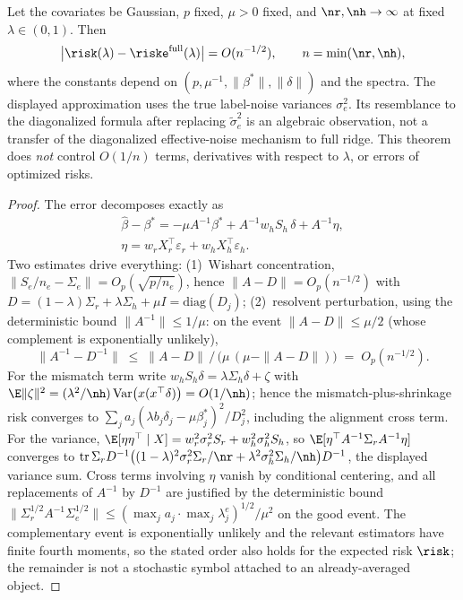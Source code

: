 \begin{theorem}\label{supp:thm:t1b}
Let the covariates be Gaussian, $p$ fixed, $\mu > 0$ fixed, and $\nr, \nh \to \infty$ at fixed $\lambda \in (0,1)$.
Then
\begin{equation}
  \big|\risk(\lambda)-\riske^{\mathrm{full}}(\lambda)\big| = O(n^{-1/2}),
  \qquad n=\min(\nr,\nh),
  \label{supp:eq:t1b}
\end{equation}
where the constants depend on $(p,\mu^{-1},\|\beta^*\|,\|\delta\|)$ and the spectra.
The displayed approximation uses the true label-noise variances $\sigma_e^2$. Its resemblance to the diagonalized formula after replacing $\tilde\sigma_e^2$ is an algebraic observation, not a transfer of the diagonalized effective-noise mechanism to full ridge.
This theorem does \emph{not} control $O(1/n)$ terms, derivatives with respect to $\lambda$, or errors of optimized risks.
\end{theorem}

\begin{proof}
The error decomposes exactly as
\begin{equation}
\begin{gathered}
\hat\beta - \beta^* = -\mu A^{-1}\beta^* + A^{-1} w_h S_h\, \delta + A^{-1}\eta,
\\[2pt]
\eta = w_r X_r^\top\varepsilon_r + w_h X_h^\top\varepsilon_h .
\end{gathered}
\end{equation}
Two estimates drive everything: (1)~Wishart concentration, $\|S_e/n_e - \Sigma_e\| = O_p(\sqrt{p/n_e})$, hence $\|A - D\| = O_p(n^{-1/2})$ with $D = (1-\lambda)\Sigma_r + \lambda\Sigma_h + \mu I = \mathrm{diag}(D_j)$; (2)~resolvent perturbation, using the deterministic bound $\|A^{-1}\| \le 1/\mu$: on the event $\|A-D\| \le \mu/2$ (whose complement is exponentially unlikely),
\begin{equation}
\|A^{-1} - D^{-1}\| \;\le\; \|A-D\|\,\big/\,\big(\mu\,(\mu-\|A-D\|)\big) \;=\; O_p(n^{-1/2}) .
\end{equation}
For the mismatch term write $w_h S_h\delta = \lambda\Sigma_h\delta + \zeta$ with $\E\|\zeta\|^2 = (\lambda^2/\nh)\,\mathrm{Var}\big(x(x^\top\delta)\big) = O(1/\nh)$; hence the mismatch-plus-shrinkage risk converges to $\sum_j a_j(\lambda b_j\delta_j - \mu\beta^*_j)^2/D_j^2$, including the alignment cross term.
For the variance, $\E[\eta\eta^\top \mid X] = w_r^2\sigma_r^2 S_r + w_h^2\sigma_h^2 S_h$, so $\E[\eta^\top A^{-1}\Sigma_r A^{-1}\eta]$ converges to $\mathrm{tr}\, \Sigma_r D^{-1}\big((1-\lambda)^2\sigma_r^2\Sigma_r/\nr + \lambda^2\sigma_h^2\Sigma_h/\nh\big)D^{-1}$, the displayed variance sum.
Cross terms involving $\eta$ vanish by conditional centering, and all replacements of $A^{-1}$ by $D^{-1}$ are justified by the deterministic bound $\|\Sigma_r^{1/2}A^{-1}\Sigma_e^{1/2}\| \le (\max_j a_j \cdot \max_j \lambda^e_j)^{1/2}/\mu^2$ on the good event.
The complementary event is exponentially unlikely and the relevant estimators have finite fourth moments, so the stated order also holds for the expected risk $\risk$; the remainder is not a stochastic symbol attached to an already-averaged object.
\end{proof}

